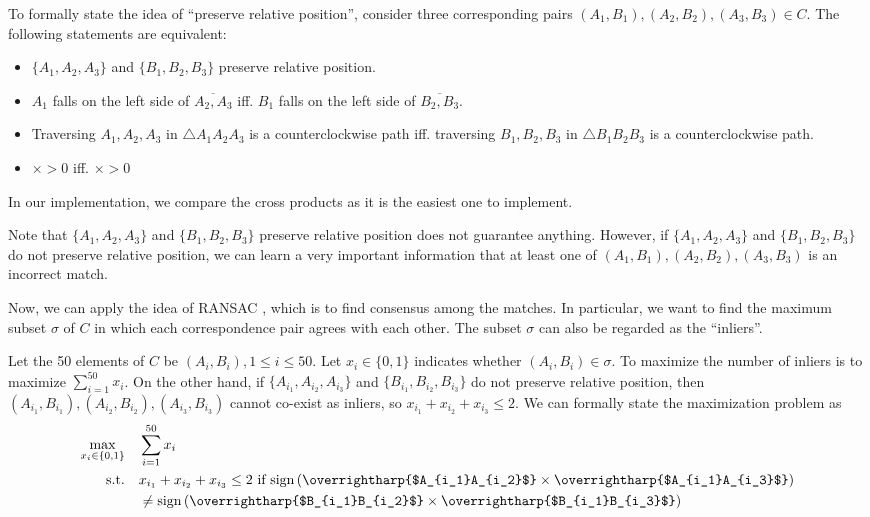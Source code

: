 \documentclass[10pt,twocolumn,letterpaper]{article}
\begin{document}
To formally state the idea of ``preserve relative position'', consider three corresponding pairs $(A_1, B_1), (A_2, B_2), (A_3, B_3) \in C$. The following statements are equivalent: 
\begin{itemize}
    \item $\{A_1, A_2, A_3\}$ and $\{B_1, B_2, B_3\}$ preserve relative position. 
    \item $A_1$ falls on the left side of $\overline{A_2, A_3}$ iff. $B_1$ falls on the left side of $\overline{B_2, B_3}$.
    \item Traversing $A_1, A_2, A_3$ in $\triangle A_1A_2A_3$ is a counterclockwise path iff. traversing $B_1, B_2, B_3$ in $\triangle B_1B_2B_3$ is a counterclockwise path. 
    \item {}$\times$$>0$ iff. $\times$$>0$ 
\end{itemize}
In our implementation, we compare the cross products as it is the easiest one to implement. 

Note that $\{A_1, A_2, A_3\}$ and $\{B_1, B_2, B_3\}$ preserve relative position does not guarantee anything. However, if $\{A_1, A_2, A_3\}$ and $\{B_1, B_2, B_3\}$ do not preserve relative position, we can learn a very important information that at least one of $(A_1, B_1), (A_2, B_2), (A_3, B_3)$ is an incorrect match. 

Now, we can apply the idea of RANSAC \cite{RANSAC}, which is to find consensus among the matches. In particular, we want to find the maximum subset $\sigma$ of $C$ in which each correspondence pair agrees with each other. The subset $\sigma$ can also be regarded as the ``inliers''. 

Let the 50 elements of $C$ be $(A_i, B_i), 1\leq i\leq50$. Let $x_i \in \{0, 1\}$ indicates whether $(A_i, B_i) \in \sigma$. To maximize the number of inliers is to maximize $\sum_{i=1}^{50} x_i$. On the other hand, if $\{A_{i_1}, A_{i_2}, A_{i_3}\}$ and $\{B_{i_1}, B_{i_2}, B_{i_3}\}$ do not preserve relative position, then $(A_{i_1}, B_{i_1}), (A_{i_2}, B_{i_2}), (A_{i_3}, B_{i_3})$ cannot co-exist as inliers, so $x_{i_1}+x_{i_2}+x_{i_3}\leq 2$. We can formally state the maximization problem as 
\begin{equation}
    \begin{aligned}
        \max_{x_i\in\{0,1\}} \quad & \sum_{i=1}^{50}x_i\\
        \textrm{s.t.} \quad & x_{i_1}+x_{i_2}+x_{i_3}\leq 2 \textrm{ if } \textrm{sign}\left(\textrm{\overrightharp{$A_{i_1}A_{i_2}$}}\times\textrm{\overrightharp{$A_{i_1}A_{i_3}$}}\right)\\
        & \neq\textrm{sign}\left(\textrm{\overrightharp{$B_{i_1}B_{i_2}$}}\times\textrm{\overrightharp{$B_{i_1}B_{i_3}$}}\right)
    \end{aligned}
\end{equation}
\end{document}
